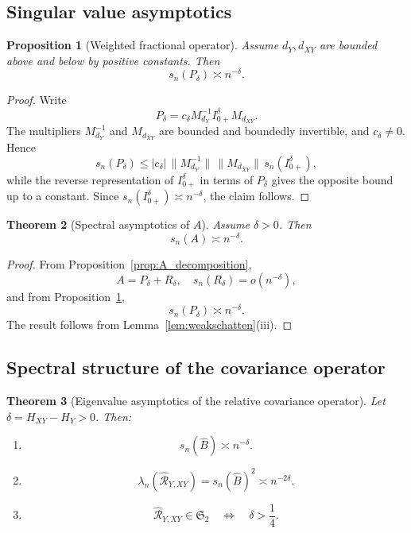 \documentclass[11pt,a4paper]{amsart}
\theoremstyle{plain}
\newtheorem{theorem}{Theorem}[section]
\newtheorem{proposition}[theorem]{Proposition}
\theoremstyle{definition}
\theoremstyle{remark}
\begin{document}
\subsection{Singular value asymptotics}

\begin{proposition}[Weighted fractional operator]\label{prop:weighted}
Assume $d_Y,d_{XY}$ are bounded above and below by positive constants. Then
\[
s_n(P_\delta) \asymp n^{-\delta}.
\]
\end{proposition}

\begin{proof}
Write
\[
P_\delta=c_\delta M_{d_Y}^{-1} I_{0+}^{\delta}M_{d_{XY}}.
\]
The multipliers $M_{d_Y}^{-1}$ and $M_{d_{XY}}$ are bounded and boundedly invertible, and
$c_\delta\ne0$. Hence
\[
s_n(P_\delta)\le |c_\delta|\,
\|M_{d_Y}^{-1}\|\,\|M_{d_{XY}}\|\,s_n(I_{0+}^{\delta}),
\]
while the reverse representation of $I_{0+}^{\delta}$ in terms of $P_\delta$ gives the opposite
bound up to a constant. Since $s_n(I_{0+}^{\delta})\asymp n^{-\delta}$, the claim follows.
\end{proof}

\begin{theorem}[Spectral asymptotics of $A$]\label{thm:A_asymp}
Assume $\delta > 0$. Then
\[
s_n(A) \asymp n^{-\delta}.
\]
\end{theorem}

\begin{proof}
From Proposition~\ref{prop:A_decomposition},
\[
A = P_\delta + R_\delta,
\quad
s_n(R_\delta) = o(n^{-\delta}),
\]
and from Proposition~\ref{prop:weighted},
\[
s_n(P_\delta) \asymp n^{-\delta}.
\]
The result follows from Lemma~\ref{lem:weakschatten}(iii).
\end{proof}

\subsection{Spectral structure of the covariance operator}

\begin{theorem}[Eigenvalue asymptotics of the relative covariance operator]\label{thm:T_asymp}
Let $\delta = H_{XY} - H_Y > 0$. Then:
\begin{enumerate}[label=(\roman*)]
\item
\[
s_n(\widehat B) \asymp n^{-\delta}.
\]
\item
\[
\lambda_n(\widehat{\mathcal R}_{Y,XY}) = s_n(\widehat B)^2 \asymp n^{-2\delta}.
\]
\item
\[
\widehat{\mathcal R}_{Y,XY} \in \mathfrak S_2
\quad\Longleftrightarrow\quad
\delta > \frac14.
\]
\end{enumerate}
\end{theorem}
\end{document}
